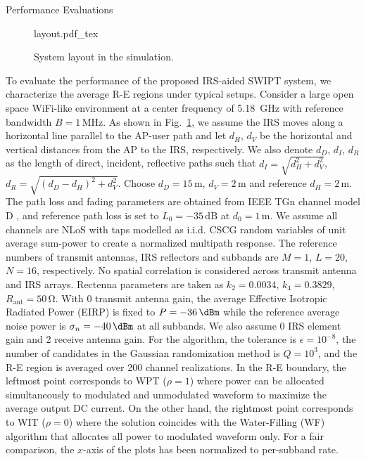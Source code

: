 \documentclass[journal]{IEEEtran}
\begin{document}
	\begin{section}{Performance Evaluations}\label{se:performance_evaluation}
		\begin{figure}[!t]
			\centering
			\def\svgwidth{\columnwidth}
			{layout.pdf_tex}
			\caption{System layout in the simulation.}
			\label{fi:layout}
		\end{figure}
		To evaluate the performance of the proposed IRS-aided SWIPT system, we characterize the average R-E regions under typical setups. Consider a large open space WiFi-like environment at a center frequency of \SI{5.18}{\GHz} with reference bandwidth $B=1\,\si{\MHz}$. As shown in Fig.~\ref{fi:layout}, we assume the IRS moves along a horizontal line parallel to the AP-user path and let $d_H$, $d_V$ be the horizontal and vertical distances from the AP to the IRS, respectively. We also denote $d_D$, $d_I$, $d_R$ as the length of direct, incident, reflective paths such that $d_I=\sqrt{d_H^2+d_V^2}$, $d_R=\sqrt{(d_D-d_H)^2+d_V^2}$. Choose $d_D=15\,\si{\meter}$, $d_V=2\,\si{\meter}$ and reference $d_H=2\,\si{\meter}$. The path loss and fading parameters are obtained from IEEE TGn channel model D \cite{Erceg2004}, and reference path loss is set to $L_0=-35\,\si{\dB}$ at $d_0=1\,\si{\meter}$. We assume all channels are NLoS with taps modelled as i.i.d. CSCG random variables of unit average sum-power to create a normalized multipath response. The reference numbers of transmit antennas, IRS reflectors and subbands are $M=1$, $L=20$, $N=16$, respectively. No spatial correlation is considered across transmit antenna and IRS arrays. Rectenna parameters are taken as $k_2=0.0034$, $k_4=0.3829$, $R_{\text{ant}}=50\,\si{\ohm}$. With \SI{0}{\dBi} transmit antenna gain, the average Effective Isotropic Radiated Power (EIRP) is fixed to $P=-36\,\si{\dBm}$ while the reference average noise power is $\sigma_n=-40\,\si{\dBm}$ at all subbands. We also assume \SI{0}{\dBi} IRS element gain and \SI{2}{\dBi} receive antenna gain. For the algorithm, the tolerance is $\epsilon=10^{-8}$, the number of candidates in the Gaussian randomization method is $Q=10^{3}$, and the R-E region is averaged over \num{200} channel realizations. In the R-E boundary, the leftmost point corresponds to WPT ($\rho=1$) where power can be allocated simultaneously to modulated and unmodulated waveform to maximize the average output DC current. On the other hand, the rightmost point corresponds to WIT ($\rho=0$) where the solution coincides with the Water-Filling (WF) algorithm that allocates all power to modulated waveform only. For a fair comparison, the $x$-axis of the plots has been normalized to per-subband rate.


\end{section}
\end{document}
